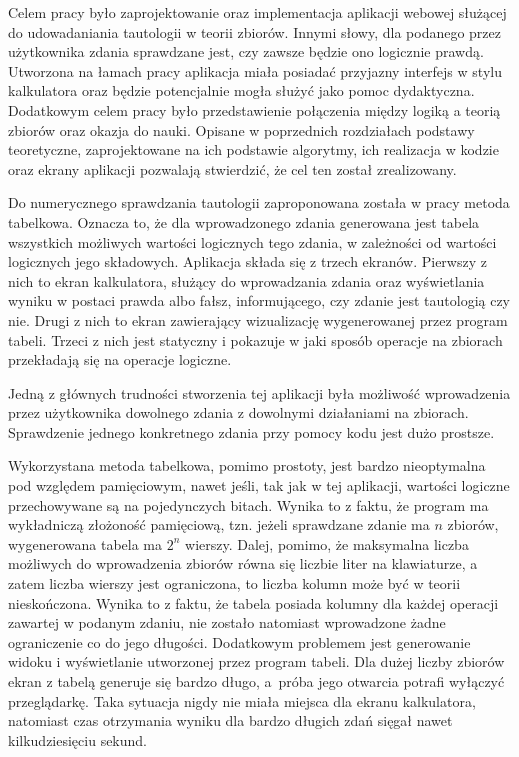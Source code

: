\documentclass{SGGW-thesis}
\begin{document}
\begin{paragraph}{}
    Celem pracy było zaprojektowanie oraz implementacja aplikacji webowej służącej do udowadaniania tautologii w teorii zbiorów. Innymi słowy, dla podanego przez użytkownika zdania sprawdzane jest, czy zawsze będzie ono logicznie prawdą. Utworzona na łamach pracy aplikacja miała posiadać przyjazny interfejs w stylu kalkulatora oraz będzie potencjalnie mogła służyć jako pomoc dydaktyczna. Dodatkowym celem pracy było przedstawienie połączenia między logiką a teorią zbiorów oraz okazja do nauki. Opisane w poprzednich rozdziałach podstawy teoretyczne, zaprojektowane na ich podstawie algorytmy, ich realizacja w kodzie oraz ekrany aplikacji pozwalają stwierdzić, że cel ten został zrealizowany.

    Do numerycznego sprawdzania tautologii zaproponowana została w pracy metoda tabelkowa. Oznacza to, że dla wprowadzonego zdania generowana jest tabela wszystkich możliwych wartości logicznych tego zdania, w zależności od wartości logicznych jego składowych. Aplikacja składa się z trzech ekranów. Pierwszy z nich to ekran kalkulatora, służący do wprowadzania zdania oraz wyświetlania wyniku w postaci prawda albo fałsz, informującego, czy zdanie jest tautologią czy nie. Drugi z nich to ekran zawierający wizualizację wygenerowanej przez program tabeli. Trzeci z nich jest statyczny i pokazuje w jaki sposób operacje na zbiorach przekładają się na operacje logiczne.

    Jedną z głównych trudności stworzenia tej aplikacji była możliwość wprowadzenia przez użytkownika dowolnego zdania z dowolnymi działaniami na zbiorach. Sprawdzenie jednego konkretnego zdania przy pomocy kodu jest dużo prostsze.

    Wykorzystana metoda tabelkowa, pomimo prostoty, jest bardzo nieoptymalna pod względem pamięciowym, nawet jeśli, tak jak w tej aplikacji, wartości logiczne przechowywane są na pojedynczych bitach. Wynika to z faktu, że program ma wykładniczą złożoność pamięciową, tzn. jeżeli sprawdzane zdanie ma $n$ zbiorów, wygenerowana tabela ma $2^{n}$ wierszy. Dalej, pomimo, że maksymalna liczba możliwych do wprowadzenia zbiorów równa się liczbie liter na klawiaturze, a zatem liczba wierszy jest ograniczona, to liczba kolumn może być w teorii nieskończona. Wynika to z faktu, że tabela posiada kolumny dla każdej operacji zawartej w podanym zdaniu, nie zostało natomiast wprowadzone żadne ograniczenie co do jego długości. Dodatkowym problemem jest generowanie widoku i wyświetlanie utworzonej przez program tabeli. Dla dużej liczby zbiorów ekran z tabelą generuje się bardzo długo, a~próba jego otwarcia potrafi wyłączyć przeglądarkę. Taka sytuacja nigdy nie miała miejsca dla ekranu kalkulatora, natomiast czas otrzymania wyniku dla bardzo długich zdań sięgał nawet kilkudziesięciu sekund.


\end{paragraph}
\end{document}
